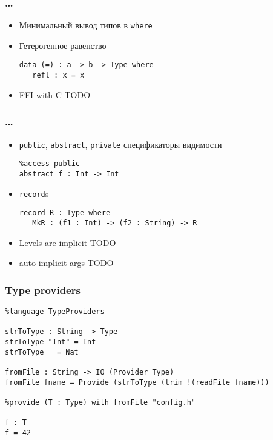 \begin{frame}[fragile]
   \frametitle{\dots}
   \begin{itemize}
   \item Минимальный вывод типов в \texttt{\color{kwcolor}where}
   \item Гетерогенное равенство
      \begin{lstlisting}
data (=) : a -> b -> Type where
   refl : x = x
      \end{lstlisting}
   \item FFI with C
      TODO
   \end{itemize}
\end{frame}

\begin{frame}[fragile]
   \frametitle{\dots}
   \begin{itemize}
   \item \texttt{\color{kwcolor}public}, \texttt{\color{kwcolor}abstract},
         \texttt{\color{kwcolor}private} спецификаторы видимости
      \begin{lstlisting}
%access public
abstract f : Int -> Int
      \end{lstlisting}
   \item \texttt{\color{kwcolor}record}s
      \begin{lstlisting}
record R : Type where
   MkR : (f1 : Int) -> (f2 : String) -> R
      \end{lstlisting}
   \item Levels are implicit
      TODO
   \item auto implicit args
      TODO
   \end{itemize}
\end{frame}

\begin{frame}[fragile]
   \frametitle{Type providers} %
   \begin{lstlisting}
%language TypeProviders

strToType : String -> Type
strToType "Int" = Int
strToType _ = Nat

fromFile : String -> IO (Provider Type)
fromFile fname = Provide (strToType (trim !(readFile fname)))

%provide (T : Type) with fromFile "config.h"

f : T
f = 42
   \end{lstlisting}
\end{frame}

